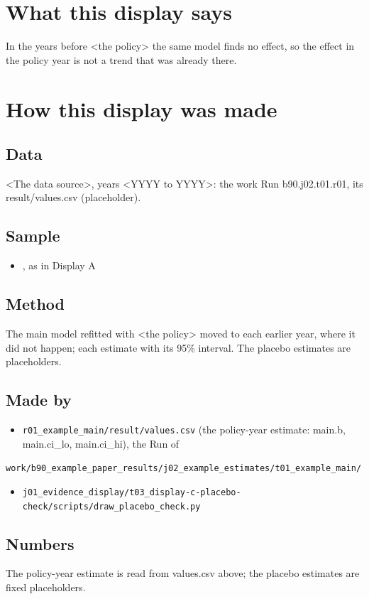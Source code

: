 \documentclass[12pt]{article}
\begin{document}
\makeatletter\renewcommand{\fps@figure}{H}\renewcommand{\fps@table}{H}\makeatother
\renewcommand{\figurename}{eFigure}\renewcommand{\tablename}{eTable}\renewcommand{\thefigure}{1}\renewcommand{\thetable}{1}

\clearpage
\section*{What this display says}
In the years before <the policy> the same model finds no effect, so the effect in the policy year is not a trend that was already there.

\section*{How this display was made}
\subsection*{Data}
<The data source>, years <YYYY to YYYY>: the work Run b90.j02.t01.r01, its result/values.csv (placeholder).

\subsection*{Sample}
\begin{itemize}\item <who is in it>, as in Display A
\end{itemize}
\subsection*{Method}
The main model refitted with <the policy> moved to each earlier year, where it did not happen; each estimate with its 95\% interval. The placebo estimates are placeholders.

\subsection*{Made by}
\begin{itemize}\item \texttt{r01\_example\_main/result/values.csv} (the policy-year estimate: main.b, main.ci\_lo, main.ci\_hi), the Run of
\end{itemize}
\texttt{work/b90\_example\_paper\_results/j02\_example\_estimates/t01\_example\_main/}

\begin{itemize}\item \texttt{j01\_evidence\_display/t03\_display-c-placebo-check/scripts/draw\_placebo\_check.py}
\end{itemize}
\subsection*{Numbers}
The policy-year estimate is read from values.csv above; the placebo estimates are fixed placeholders.
\end{document}
